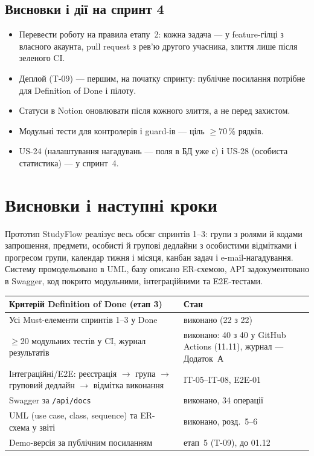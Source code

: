 \documentclass[12pt]{article}
\begin{document}
\subsection*{Висновки і дії на спринт 4}
\begin{itemize}[leftmargin=1.2em,itemsep=2pt]
  \item Перевести роботу на правила етапу~2: кожна задача --- у feature-гілці з власного акаунта, pull request з рев'ю другого учасника, злиття лише після зеленого CI.
  \item Деплой (T-09) --- першим, на початку спринту: публічне посилання потрібне для Definition of Done і пілоту.
  \item Статуси в Notion оновлювати після кожного злиття, а не перед захистом.
  \item Модульні тести для контролерів і guard-ів --- ціль $\geq$70\,\% рядків.
  \item US-24 (налаштування нагадувань --- поля в БД уже є) і US-28 (особиста статистика) --- у спринт~4.
\end{itemize}

\section{Висновки і наступні кроки}
Прототип StudyFlow реалізує весь обсяг спринтів 1--3: групи з ролями й кодами запрошення, предмети, особисті й групові дедлайни з особистими відмітками і прогресом групи, календар тижня і місяця, канбан задач і e-mail-нагадування. Систему промодельовано в UML, базу описано ER-схемою, API задокументовано в Swagger, код покрито модульними, інтеграційними та E2E-тестами.

\begin{tabularx}{\textwidth}{Y L{5.4cm}}
\toprule
Критерій Definition of Done (етап 3) & Стан\\
\midrule
Усі Must-елементи спринтів 1--3 у Done & виконано (22 з 22)\\
$\geq$20 модульних тестів у CI, журнал результатів & виконано: 40 з 40 у GitHub Actions (11.11), журнал --- Додаток~А\\
Інтеграційні/E2E: реєстрація $\to$ група $\to$ груповий дедлайн $\to$ відмітка виконання & IT-05--IT-08, E2E-01\\
Swagger за \texttt{/api/docs} & виконано, 34 операції\\
UML (use case, class, sequence) та ER-схема у звіті & виконано, розд.~5--6\\
Demo-версія за публічним посиланням & етап~5 (T-09), до 01.12\\
\bottomrule
\end{tabularx}
\end{document}
